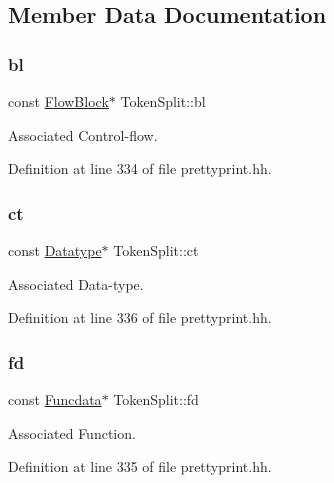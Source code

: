 \subsection{Member Data Documentation}
\mbox{\label{class_token_split_a7e8554d5fe80fcf4e70d3753e8924874}} 
\subsubsection{\texorpdfstring{bl}{bl}}
{\footnotesize\ttfamily const \mbox{\hyperlink{class_flow_block}{Flow\+Block}}$\ast$ Token\+Split\+::bl}



Associated Control-\/flow. 



Definition at line 334 of file prettyprint.\+hh.

\mbox{\label{class_token_split_a8966907dba26ba691ffec5cde4676958}} 
\subsubsection{\texorpdfstring{ct}{ct}}
{\footnotesize\ttfamily const \mbox{\hyperlink{class_datatype}{Datatype}}$\ast$ Token\+Split\+::ct}



Associated Data-\/type. 



Definition at line 336 of file prettyprint.\+hh.

\mbox{\label{class_token_split_a63fd12d0d061d8b99038c354fbb8d422}} 
\subsubsection{\texorpdfstring{fd}{fd}}
{\footnotesize\ttfamily const \mbox{\hyperlink{class_funcdata}{Funcdata}}$\ast$ Token\+Split\+::fd}



Associated Function. 



Definition at line 335 of file prettyprint.\+hh.

\mbox{\label{class_token_split_a73a06d2744693a3e909b03b9943efb52}} 
